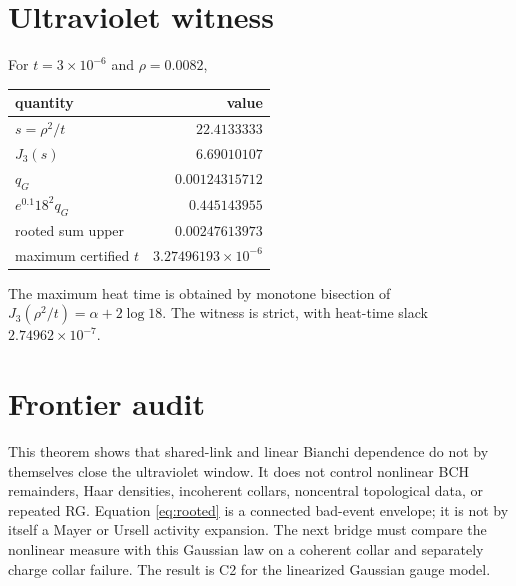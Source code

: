 \documentclass[11pt]{article}
\begin{document}
\section{Ultraviolet witness}

For $t=3\times10^{-6}$ and $\rho=0.0082$,
\begin{center}
\begin{tabular}{@{}lr@{}}
\toprule
quantity & value\\
\midrule
$s=\rho^2/t$ & $22.4133333$\\
$J_3(s)$ & $6.69010107$\\
$q_G$ & $0.00124315712$\\
$e^{0.1}18^2q_G$ & $0.445143955$\\
rooted sum upper & $0.00247613973$\\
maximum certified $t$ & $3.27496193\times10^{-6}$\\
\bottomrule
\end{tabular}
\end{center}
The maximum heat time is obtained by monotone bisection of
$J_3(\rho^2/t)=\alpha+2\log18$.  The witness is strict, with heat-time slack
$2.74962\times10^{-7}$.

\section{Frontier audit}

This theorem shows that shared-link and linear Bianchi dependence do not by
themselves close the ultraviolet window.  It does not control nonlinear BCH
remainders, Haar densities, incoherent collars, noncentral topological data,
or repeated RG.  Equation \eqref{eq:rooted} is a connected bad-event envelope;
it is not by itself a Mayer or Ursell activity expansion.  The next bridge must compare the nonlinear measure with this
Gaussian law on a coherent collar and separately charge collar failure.  The
result is C2 for the linearized Gaussian gauge model.
\end{document}
